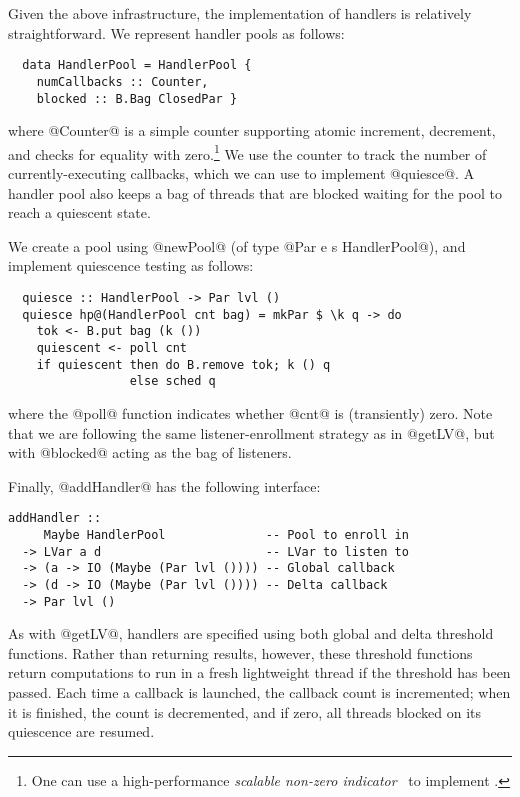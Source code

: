Given the above infrastructure, the implementation of handlers is
relatively straightforward.  We represent handler pools as follows:

\vspace{-4mm}
\singlespacing
\begin{lstlisting}
  data HandlerPool = HandlerPool {
    numCallbacks :: Counter,  
    blocked :: B.Bag ClosedPar }
\end{lstlisting}
\doublespacing
%
where @Counter@ is a simple counter supporting atomic increment,
decrement, and checks for equality with zero.\footnote{One can use a
  high-performance \emph{scalable non-zero indicator}~\cite{snzi} to
  implement .
}  We use the
counter to track the number of currently-executing callbacks, which we
can use to implement @quiesce@.  A handler pool also keeps a bag of
threads that are blocked waiting for the pool to reach a quiescent
state.

We create a pool using @newPool@ (of type @Par e s HandlerPool@), and
implement quiescence testing as follows:

\singlespacing
\begin{lstlisting}
  quiesce :: HandlerPool -> Par lvl ()
  quiesce hp@(HandlerPool cnt bag) = mkPar $ \k q -> do
    tok <- B.put bag (k ())
    quiescent <- poll cnt
    if quiescent then do B.remove tok; k () q
                 else sched q
\end{lstlisting}
\doublespacing

where the @poll@ function indicates whether @cnt@ is (transiently)
zero.  Note that we are following the same listener-enrollment
strategy as in @getLV@, but with @blocked@ acting as the bag of
listeners.

Finally, @addHandler@ has the following interface:

\singlespacing
\begin{lstlisting}
addHandler :: 
     Maybe HandlerPool              -- Pool to enroll in
  -> LVar a d                       -- LVar to listen to
  -> (a -> IO (Maybe (Par lvl ()))) -- Global callback
  -> (d -> IO (Maybe (Par lvl ()))) -- Delta callback
  -> Par lvl ()
\end{lstlisting}
\doublespacing

As with @getLV@, handlers are specified using both global and delta
threshold functions.  Rather than returning results, however, these
threshold functions return computations to run in a fresh lightweight
thread if the threshold has been passed.  Each time a callback is
launched, the callback count is incremented; when it is finished, the
count is decremented, and if zero, all threads blocked on its
quiescence are resumed.


